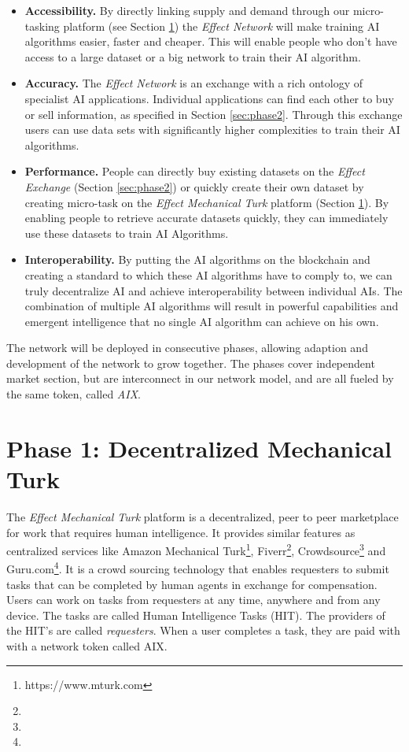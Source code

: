 \documentclass{article}
\begin{document}
\begin{itemize}
\item \textbf{Accessibility.} By directly linking supply and demand
  through our micro-tasking platform (see Section \ref{sec:phase1})
  the \emph{Effect Network} will make training AI algorithms easier,
  faster and cheaper. This will enable people who don't have access to
  a large dataset or a big network to train their AI algorithm.
\item \textbf{Accuracy.} The \emph{Effect Network} is an exchange with
  a rich ontology of specialist AI applications. Individual
  applications can find each other to buy or sell information, as
  specified in Section \ref{sec:phase2}. Through this exchange users
  can use data sets with significantly higher complexities to train
  their AI algorithms.
\item \textbf{Performance.} People can directly buy existing datasets
  on the \emph{Effect Exchange} (Section \ref{sec:phase2}) or quickly
  create their own dataset by creating micro-task on the \emph{Effect
    Mechanical Turk} platform (Section \ref{sec:phase1}). By enabling
  people to retrieve accurate datasets quickly, they can immediately
  use these datasets to train AI Algorithms.
\item \textbf{Interoperability.} By putting the AI algorithms on the
  blockchain and creating a standard to which these AI algorithms have
  to comply to, we can truly decentralize AI and achieve
  interoperability between individual AIs. The combination of multiple
  AI algorithms will result in powerful capabilities and emergent
  intelligence that no single AI algorithm can achieve on his own.
\end{itemize}

The network will be deployed in consecutive phases, allowing adaption
and development of the network to grow together. The phases cover
independent market section, but are interconnect in our network model,
and are all fueled by the same token, called \emph{AIX}.

\section{Phase 1: Decentralized Mechanical Turk}
\label{sec:phase1}
The \emph{Effect Mechanical Turk} platform is a decentralized, peer to
peer marketplace for work that requires human intelligence.  It
provides similar features as centralized services like Amazon
Mechanical Turk\footnote{https://www.mturk.com}, Fiverr\footnote{},
Crowdsource\footnote{} and Guru.com\footnote{}. It is a crowd sourcing
technology that enables requesters to submit tasks that can be
completed by human agents in exchange for compensation. Users can work
on tasks from requesters at any time, anywhere and from any
device. The tasks are called Human Intelligence Tasks (HIT). The
providers of the HIT’s are called \emph{requesters}. When a user
completes a task, they are paid with with a network token called AIX.
\end{document}
